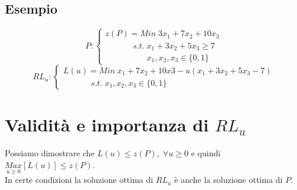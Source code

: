 \subsection{Esempio}
\begin{displaymath}
P:
\begin{cases}
z(P)=Min\;3x_{1}+7x_{2}+10x_{3} \\
\;\;\;\;\;\;\;\;\;\;\;\;s.t.\;x_{1}+3x_{2}+5x_{3}\ge 7 \\
\;\;\;\;\;\;\;\;\;\;\;\;\;\;\;\;\;\;x_{1},x_{2},x_{3}\in\{0,1\}
\end{cases}
\end{displaymath}
\begin{displaymath}
RL_{u}:
\begin{cases}
L(u)=Min\;x_{1}+7x_{2}+10x{3}-u(x_{1}+3x_{2}+5x_{3}-7) \\
\;\;\;\;\;\;\;\;\;\;\;\;s.t.\;x_{1},x_{2},x_{3}\in\{0,1\}
\end{cases}
\end{displaymath}

\section{Validità e importanza di $RL_{u}$}
Possiamo dimostrare che $L(u)\le z(P),\;\forall u\ge0$ e quindi $\underset{u\ge 0}{Max}[L(u)]\le z(P)$.\\
In certe condizioni la soluzione ottima di $RL_{u}$ è anche la soluzione ottima di $P$.

